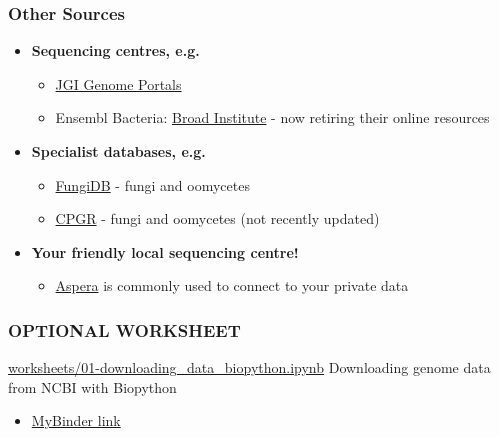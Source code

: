 \begin{frame}
  \frametitle{Other Sources}
    \begin{itemize}
      \item \textcolor{hutton_green}{\textbf{Sequencing centres, e.g.}}
      \begin{itemize}
        \item \textcolor{hutton_purple}{\href{http://genome.jgi.doe.gov/}{JGI Genome Portals}}
        \item Ensembl Bacteria: \textcolor{hutton_purple}{\href{https://www.broadinstitute.org/}{Broad Institute}} - now retiring their online resources
      \end{itemize}
      \item \textcolor{hutton_blue}{\textbf{Specialist databases, e.g.}}
      \begin{itemize}
        \item \textcolor{hutton_purple}{\href{http://fungidb.org/fungidb/}{FungiDB}} - fungi and oomycetes
        \item \textcolor{hutton_purple}{\href{http://cpgr.plantbiology.msu.edu/}{CPGR}} - fungi and oomycetes (not recently updated)
      \end{itemize}
      \item \textcolor{RawSienna}{\textbf{Your friendly local sequencing centre!}}
      \begin{itemize}
        \item \textcolor{hutton_purple}{\href{http://asperasoft.com/}{Aspera}} is commonly used to connect to your private data
      \end{itemize}
    \end{itemize}
\end{frame}

\begin{frame}
  \frametitle{OPTIONAL WORKSHEET}
  \begin{alertblock}{\url{worksheets/01-downloading_data_biopython.ipynb}}
    Downloading genome data from NCBI with Biopython
  \end{alertblock}
  \begin{itemize}
    \item \textcolor{hutton_purple}{\href{http://mybinder.org/repo/widdowquinn/Teaching-EMBL-Plant-Path-Genomics}{MyBinder link}}
  \end{itemize}
\end{frame}